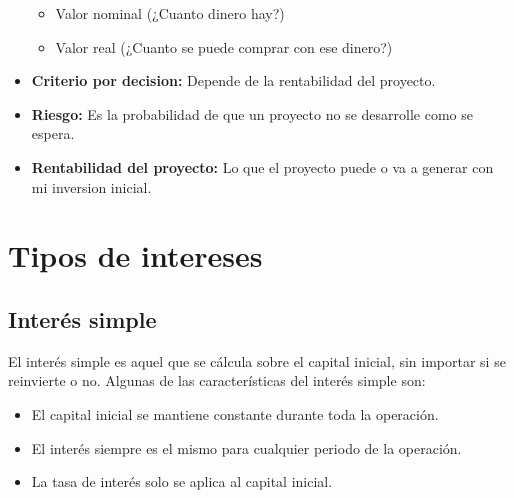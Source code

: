 \documentclass{templateNote}
\begin{document}
\begin{itemize}
    \begin{itemize}
        \item Valor nominal (¿Cuanto dinero hay?)
        \item Valor real (¿Cuanto se puede comprar con ese dinero?) 
    \end{itemize}
    \item \textbf{Criterio por decision:} Depende de la rentabilidad del proyecto.
    \item \textbf{Riesgo:} Es la probabilidad de que un proyecto no se desarrolle como se espera.
    \item \textbf{Rentabilidad del proyecto:} Lo que el proyecto puede o va a generar con mi inversion inicial.
\end{itemize}

\section{Tipos de intereses}
\subsection{Interés simple}
\noindent El interés simple es aquel que se cálcula sobre el capital inicial, sin importar si se reinvierte o no. Algunas de las características del interés simple son:
\begin{itemize}
    \item El capital inicial se mantiene constante durante toda la operación.
    \item El interés siempre es el mismo para cualquier periodo de la operación.
    \item La tasa de interés solo se aplica al capital inicial.
\end{itemize}
\end{document}
